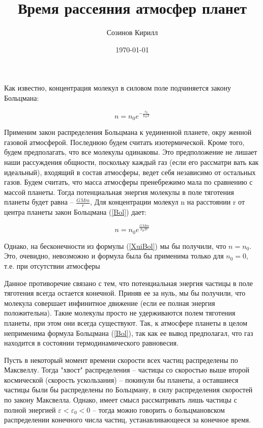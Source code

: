 \documentclass[a4paper,12pt]{article}
\author{ Созинов Кирилл}
\title{ Время рассеяния атмосфер планет}
\date{\today}
\begin{document}
	\maketitle
	
	Как известно, концентрация молекул в силовом поле подчиняется закону Больцмана:
	
	\begin{equation}\label{Bol}
		n = n_0 e^{-\frac{\varepsilon_p}{k_BT}}
	\end{equation}
	
	
   	Применим закон распределения Больцмана к уединенной планете, окру­
женной газовой атмосферой. Последнюю будем считать изотермической. Кроме
того, будем предполагать, что все молекулы одинаковы. Это предположение не
лишает наши рассуждения общности, поскольку каждый газ (если его рассматри­
вать как идеальный), входящий в состав атмосферы, ведет себя независимо от
остальных газов. Будем считать, что масса атмосферы пренебрежимо мала по
сравнению с массой планеты. Тогда потенциальная энергия молекулы в поле
тяготения планеты будет равна -- $\frac{GMm}{r}$, Для концентрации молекул n на расстоянии r от центра планеты закон Больцмана (\ref{Bol}) дает:

\begin{equation}\label{XuiBol}
	n = n_0 e^{\frac{GMm}{k_BTr}}
\end{equation}

Однако, на бесконечности из формулы (\ref{XuiBol}) мы бы получили, что $n=n_0$. Это, очевидно, невозможно и формула была бы применима только для $n_0 = 0$, т.е. при отсутствии атмосферы

Данное противоречие связано с тем, что потенциальная энергия частицы в поле тяготения всегда остается конечной. Приняв ее за нуль, мы бы получили, что молекула совершает инфинитное движение (если ее полная энергия положительна). Такие молекулы просто не удерживаются полем тяготения планеты, при этом они всегда существуют. Так, к атмосфере планеты в целом неприменима формула Больцмана (\ref{Bol}), так как ее вывод предполагал, что газ находится в состоянии термодинамического равновесия.

Пусть в некоторый момент времени скорости всех частиц распределены по Максвеллу. Тогда "хвост" распределения -- частицы со скоростью выше второй космической (скорость ускользания) -- покинули бы планеты, а оставшиеся частицы были бы распределены по Больцману, в силу распределения скоростей по закону Максвелла. Однако, имеет смысл рассматривать лишь частицы с полной энергией $\varepsilon < \varepsilon_0 < 0$ -- тогда можно говорить о больцмановском распределении конечного числа частиц, устанавливающееся за конечное время.
\end{document}
